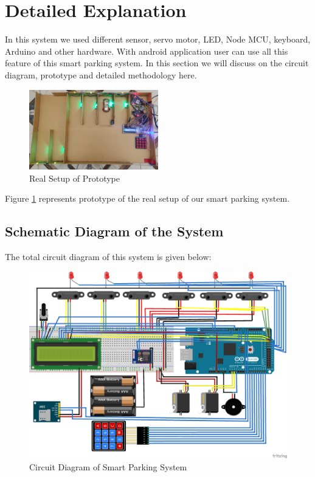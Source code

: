 \section{Detailed Explanation}
In this system we used different sensor, servo motor, LED, Node MCU, keyboard, Arduino and other hardware. With android application user can use all this feature of this smart parking system. In this section we will discuss on  the circuit diagram, prototype and detailed methodology here.

\begin{figure}[H]
\centering
\includegraphics[width=0.5\textwidth]{figures/real_setup.jpg}
\caption{Real Setup of Prototype}
\label{real_setup}
\end{figure}
Figure \ref{real_setup} represents prototype of the real setup of our smart parking system.

\subsection{Schematic Diagram of the System}
The total circuit diagram of this system is given below:

\begin{figure}[H]
\centering
\includegraphics[width=1.0\textwidth]{figures/circuit_diagram.png}
\caption{Circuit Diagram of Smart Parking System}
\label{circuit_diagram}
\end{figure}

